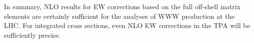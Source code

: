 In summary, NLO results for EW corrections based on the full off-shell matrix elements 
are certainly sufficient for the analyses of WWW production at the LHC.
For integrated cross sections, even NLO EW corrections in the TPA will be sufficiently precise.


\let\Herwig\undefined
\let\Pythia\undefined
\let\Sherpa\undefined
\let\Rivet\undefined
\let\Recola\undefined
\let\Professor\undefined
\let\Amegic\undefined
\let\OpenLoops\undefined
\let\Collier\undefined
\let\eps\undefined
\let\mc\undefined
\let\mr\undefined
\let\mb\undefined
\let\tm\undefined
\let\vp\undefined
\let\vP\undefined

